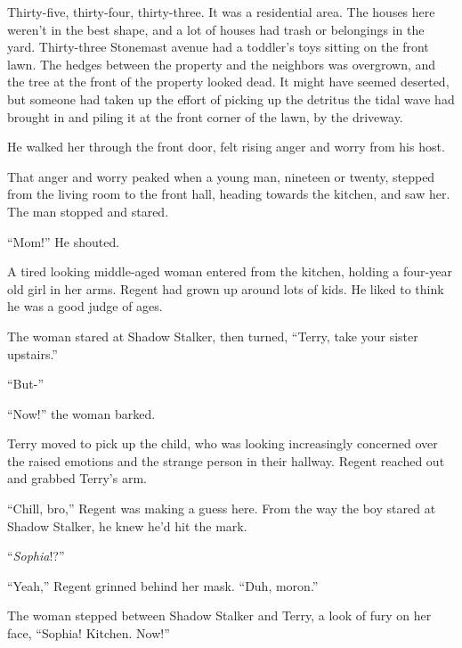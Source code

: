 Thirty-five, thirty-four, thirty-three.  It was a residential area.  The houses here weren't in the best shape, and a lot of houses had trash or belongings in the yard.  Thirty-three Stonemast avenue had a toddler's toys sitting on the front lawn.  The hedges between the property and the neighbors was overgrown, and the tree at the front of the property looked dead.  It might have seemed deserted, but someone had taken up the effort of picking up the detritus the tidal wave had brought in and piling it at the front corner of the lawn, by the driveway.



He walked her through the front door, felt rising anger and worry from his host.



That anger and worry peaked when a young man, nineteen or twenty, stepped from the living room to the front hall, heading towards the kitchen, and saw her.  The man stopped and stared.



``Mom!''  He shouted.



A tired looking middle-aged woman entered from the kitchen, holding a four-year old girl in her arms.  Regent had grown up around lots of kids.  He liked to think he was a good judge of ages.



The woman stared at Shadow Stalker, then turned, ``Terry, take your sister upstairs.''



``But-''



``Now!'' the woman barked.



Terry moved to pick up the child, who was looking increasingly concerned over the raised emotions and the strange person in their hallway.  Regent reached out and grabbed Terry's arm.



``Chill, bro,''  Regent was making a guess here.  From the way the boy stared at Shadow Stalker, he knew he'd hit the mark.



``\emph{Sophia}!?''



``Yeah,'' Regent grinned behind her mask.  ``Duh, moron.''



The woman stepped between Shadow Stalker and Terry, a look of fury on her face, ``Sophia!  Kitchen.  Now!''



